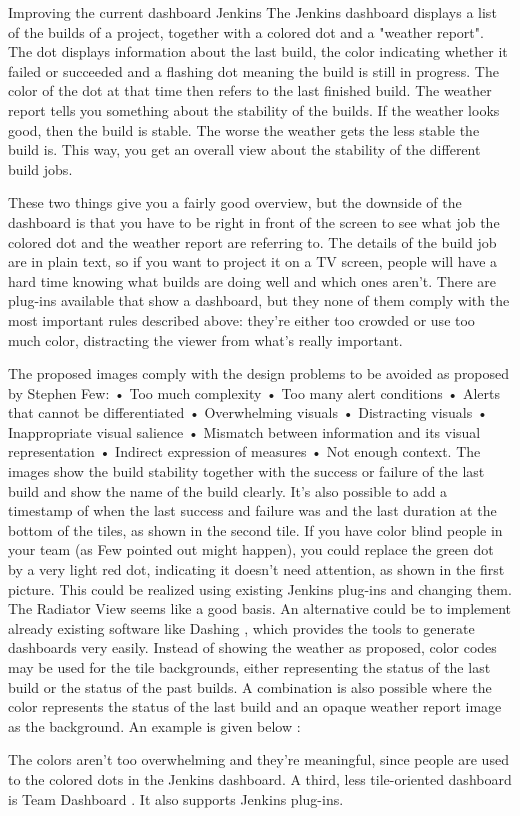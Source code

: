 \documentclass[10pt,a4paper]{report}
\begin{document}
Improving the current dashboard
Jenkins
The Jenkins dashboard displays a list of the builds of a project, together with a colored dot and a "weather report". The dot displays information about the last build, the color indicating whether it failed or succeeded and a flashing dot meaning the build is still in progress. The color of the dot at that time then refers to the last finished build.
The weather report tells you something about the stability of the builds. If the weather looks good, then the build is stable. The worse the weather gets the less stable the build is. This way, you get an overall view about the stability of the different build jobs.
 
These two things give you a fairly good overview, but the downside of the dashboard is that you have to be right in front of the screen to see what job the colored dot and the weather report are referring to. The details of the build job are in plain text, so if you want to project it on a TV screen, people will have a hard time knowing what builds are doing well and which ones aren't.
There are plug-ins available that show a dashboard, but they none of them comply with the most important rules described above: they're either too crowded or use too much color, distracting the viewer from what's really important.
  
The proposed images comply with the design problems to be avoided as proposed by Stephen Few:
•	Too much complexity
•	Too many alert conditions
•	Alerts that cannot be differentiated
•	Overwhelming visuals
•	Distracting visuals
•	Inappropriate visual salience
•	Mismatch between information and its visual representation
•	Indirect expression of measures
•	Not enough context.
The images show the build stability together with the success or failure of the last build and show the name of the build clearly. It's also possible to add a timestamp of when the last success and failure was and the last duration at the bottom of the tiles, as shown in the second tile. If you have color blind people in your team (as Few pointed out might happen), you could replace the green dot by a very light red dot, indicating it doesn't need attention, as shown in the first picture.
This could be realized using existing Jenkins plug-ins and changing them. The Radiator View  seems like a good basis.
An alternative could be to implement already existing software like Dashing , which provides the tools to generate dashboards very easily. Instead of showing the weather as proposed, color codes may be used for the tile backgrounds, either representing the status of the last build or the status of the past builds. A combination is also possible where the color represents the status of the last build and an opaque weather report image as the background. An example is given below :
 
The colors aren’t too overwhelming and they’re meaningful, since people are used to the colored dots in the Jenkins dashboard. 
A third, less tile-oriented dashboard is Team Dashboard . It also supports Jenkins plug-ins.
\end{document}
